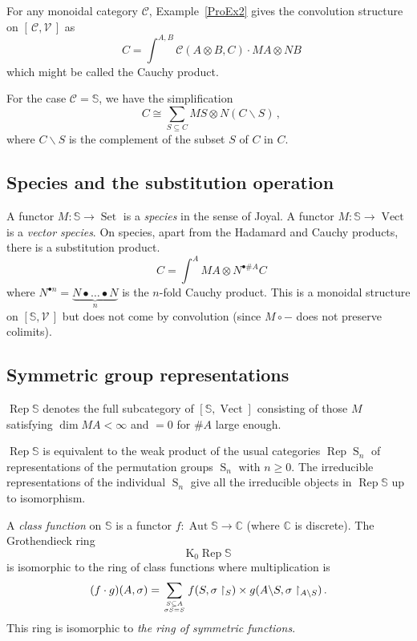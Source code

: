 \documentclass[a4paper,12pt]{article}
\theoremstyle{definition}
\theoremstyle{fact}
\theoremstyle{genquest}
\theoremstyle{step}
\newcommand{\Aut}{\operatorname{Aut}}
\newcommand{\catC}{\mathcal{C}}
\newcommand{\CC}{\mathbb{C}}
\newcommand{\ringK}{\mathrm{K}}
\newcommand{\Rep}{\operatorname{Rep}}
\newcommand{\LieS}{\operatorname{S}\nolimits}
\newcommand{\catSS}{\mathbb{S}}
\newcommand{\Set}{\operatorname{Set}}
\newcommand{\catV}{\mathcal{V}}
\newcommand{\Vect}{\operatorname{Vect}}
\begin{document}
For any monoidal category $\catC$, Example~\ref{ProEx2} gives the convolution structure on $[\,\catC,\catV\,]$ as
\[
\mathop{(M \bullet N)}C = \int^{A,B} \catC (A\otimes B,C) \cdot MA \otimes NB
\]
which might be called the Cauchy product.

For the case $\catC=\catSS$, we have the simplification
\[
\mathop{(M \bullet N)} C \cong \sum_{S \subseteq C}  MS \otimes N (C \backslash S)\,,
\]
where $C \backslash S$ is the complement of the subset $S$ of $C$ in $C$.


\subsection{Species and the substitution operation}

A functor $M : \catSS \to  \Set $ is a \emph{species} in the sense of Joyal.   
A functor  $M : \catSS \to  \Vect $ is a \emph{vector species}.    
On species, apart from the Hadamard and Cauchy products, there is a substitution product.
\[
\mathop{(M \circ N)} C = \int^A MA \otimes N^{\bullet \# A}   C
\]
where $N^{\bullet n} = \underbrace{N \bullet \ldots \bullet N}_n$  is the $n$-fold Cauchy product.    
This is a monoidal structure on $[\catSS,\catV\,]$ but does not come by convolution 
(since $M  \circ -$ does not preserve colimits).


\subsection{Symmetric group representations}

$\Rep\catSS$ denotes the full subcategory of $[\catSS, \Vect ]$ consisting of those $M$ satisfying $\dim MA < \infty$ 
and $= 0$ for $\# A$ large enough.

$\Rep\catSS$ is equivalent to the weak product of the usual categories $\Rep\LieS_n$ of representations of the permutation groups $\LieS_n$ with $n \geq 0$.    
The irreducible representations of the individual $\LieS_n$ give all the irreducible objects in $\Rep\catSS$ up to isomorphism.


A {\em class function} on $\catSS$ is a functor $f : \Aut \catSS \to \CC$ (where $\CC$ is discrete).    
The Grothendieck ring 
\[
\ringK_0 \Rep\catSS
\] 
is isomorphic to the ring of class functions where multiplication is
\[
(f \cdot g) (A, \sigma) = \sum_{S \subseteq A \atop \sigma S = S} 
  f(S, \sigma \upharpoonright_S) \times g(A\backslash S, \sigma \upharpoonright_{A\backslash S})\,.
\]
This ring is isomorphic to \emph{the ring of symmetric functions}.
\end{document}
